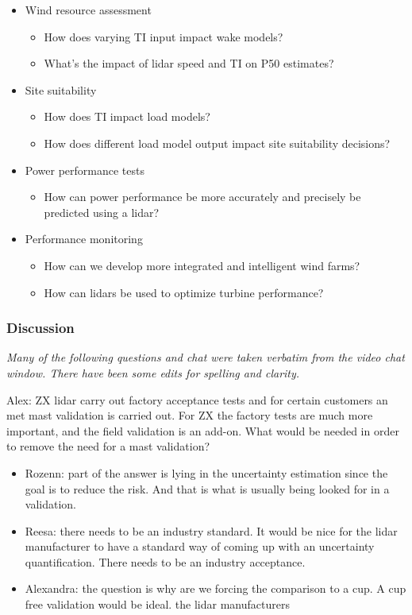 \begin{itemize}
    \item Wind resource assessment
    \begin{itemize}
        \item How does varying TI input impact wake models?
        \item What's the impact of lidar speed and TI on P50 estimates?
    \end{itemize}
    \item Site suitability 
    \begin{itemize}
        \item How does TI impact load models?
        \item How does different load model output impact site suitability decisions?
    \end{itemize}
    \item Power performance tests
    \begin{itemize}
        \item How can power performance be more accurately and precisely be predicted using a lidar?
    \end{itemize}
    \item Performance monitoring
    \begin{itemize}
        \item How can we develop more integrated and intelligent wind farms?
        \item How can lidars be used to optimize turbine performance?
    \end{itemize}
\end{itemize}

\subsubsection{Discussion}
\emph{Many of the following questions and chat were taken verbatim from the video chat window. There have been some edits for spelling and clarity.}

Alex: ZX lidar carry out factory acceptance tests and for certain customers an met mast validation is carried out. For ZX the factory tests are much more important, and the field validation is an add-on. What would be needed in order to remove the need for a mast validation?
\begin{itemize}
    \item Rozenn: part of the answer is lying in the uncertainty estimation since the goal is to reduce the risk. And that is what is usually being looked for in a validation. 
    \item Reesa: there needs to be an industry standard. It would be nice for the lidar manufacturer to have a standard way of coming up with an uncertainty quantification. There needs to be an industry acceptance. 
    \item Alexandra: the question is why are we forcing the comparison to a cup. A cup free validation would be ideal. the lidar manufacturers 
\end{itemize}

